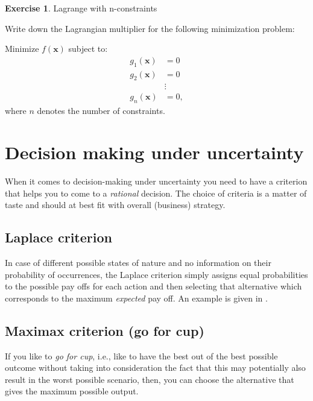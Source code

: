 \documentclass[
  12pt,
  oneside]{book}
\theoremstyle{definition}
\theoremstyle{definition}
\theoremstyle{definition}
\newtheorem{exercise}{Exercise}[chapter]
\theoremstyle{definition}
\theoremstyle{remark}
\begin{document}
\begin{exercise}
\protect\hypertarget{exr:lagrcons}{}\label{exr:lagrcons}Lagrange with n-constraints

Write down the Lagrangian multiplier for the following minimization problem:

Minimize \(f(\mathbf{x})\) subject to:
\[\begin{aligned}
    g_1(\mathbf{x})&=0 \\
    g_2(\mathbf{x})&=0\\
    &\vdots\\
    g_n(\mathbf{x})&=0,\end{aligned}\]
where \(n\) denotes the number of constraints.
\end{exercise}

\hypertarget{decision-making-under-uncertainty}{%
\section{Decision making under uncertainty}\label{decision-making-under-uncertainty}}

When it comes to decision-making under uncertainty you need to have a criterion that helps you to come to a \emph{rational} decision. The choice of criteria is a matter of taste and should at best fit with overall (business) strategy.

\hypertarget{laplace-criterion}{%
\subsection*{Laplace criterion}\label{laplace-criterion}}

In case of different possible states of nature and no information on their probability of occurrences, the Laplace criterion simply assigns equal probabilities to the possible pay offs for each action and then selecting that alternative which corresponds to the maximum \emph{expected} pay off. An example is given in \citet{Finne1998three}.

\hypertarget{maximax-criterion-go-for-cup}{%
\subsection*{Maximax criterion (go for cup)}\label{maximax-criterion-go-for-cup}}

If you like to \emph{go for cup}, i.e., like to have the best out of the best possible outcome without taking into consideration the fact that this may potentially also result in the worst possible scenario, then, you can choose the alternative that gives the maximum possible output.
\end{document}
